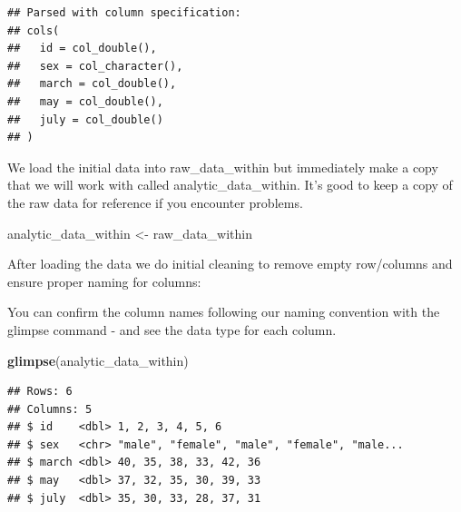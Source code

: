 \documentclass[
]{krantz}
\makeatletter
\newenvironment{Shaded}{\begin{snugshade}}{\end{snugshade}}
\newcommand{\CommentTok}[1]{\textcolor[rgb]{0.37,0.37,0.37}{\textit{#1}}}
\newcommand{\KeywordTok}[1]{\textcolor[rgb]{0.27,0.27,0.27}{\textbf{#1}}}
\newcommand{\NormalTok}[1]{#1}
\newcommand{\OperatorTok}[1]{\textcolor[rgb]{0.43,0.43,0.43}{\textbf{#1}}}
\newcommand{\StringTok}[1]{\textcolor[rgb]{0.5,0.5,0.5}{#1}}
\newenvironment{kframe}{%
\medskip{}
\setlength{\fboxsep}{.8em}
 \def\at@end@of@kframe{}%
 \ifinner\ifhmode%
  \def\at@end@of@kframe{\end{minipage}}%
  \begin{minipage}{\columnwidth}%
 \fi\fi%
 \def\FrameCommand##1{\hskip\@totalleftmargin \hskip-\fboxsep
 \colorbox{shadecolor}{##1}\hskip-\fboxsep
     \hskip-\linewidth \hskip-\@totalleftmargin \hskip\columnwidth}%
 \MakeFramed {\advance\hsize-\width
   \@totalleftmargin\z@ \linewidth\hsize
   \@setminipage}}%
 {\par\unskip\endMakeFramed%
 \at@end@of@kframe}
\renewenvironment{Shaded}{\begin{kframe}}{\end{kframe}}
\makeatother
\begin{document}
\begin{verbatim}
## Parsed with column specification:
## cols(
##   id = col_double(),
##   sex = col_character(),
##   march = col_double(),
##   may = col_double(),
##   july = col_double()
## )
\end{verbatim}

We load the initial data into raw\_data\_within but immediately make a copy that we will work with called analytic\_data\_within. It's good to keep a copy of the raw data for reference if you encounter problems.

\begin{Shaded}
\begin{Highlighting}[]
\NormalTok{analytic_data_within <-}\StringTok{ }\NormalTok{raw_data_within}
\end{Highlighting}
\end{Shaded}

After loading the data we do initial cleaning to remove empty row/columns and ensure proper naming for columns:

\begin{Shaded}
\end{Shaded}

You can confirm the column names following our naming convention with the glimpse command - and see the data type for each column.

\begin{Shaded}
\begin{Highlighting}[]
\KeywordTok{glimpse}\NormalTok{(analytic_data_within)}
\end{Highlighting}
\end{Shaded}

\begin{verbatim}
## Rows: 6
## Columns: 5
## $ id    <dbl> 1, 2, 3, 4, 5, 6
## $ sex   <chr> "male", "female", "male", "female", "male...
## $ march <dbl> 40, 35, 38, 33, 42, 36
## $ may   <dbl> 37, 32, 35, 30, 39, 33
## $ july  <dbl> 35, 30, 33, 28, 37, 31
\end{verbatim}
\end{document}
